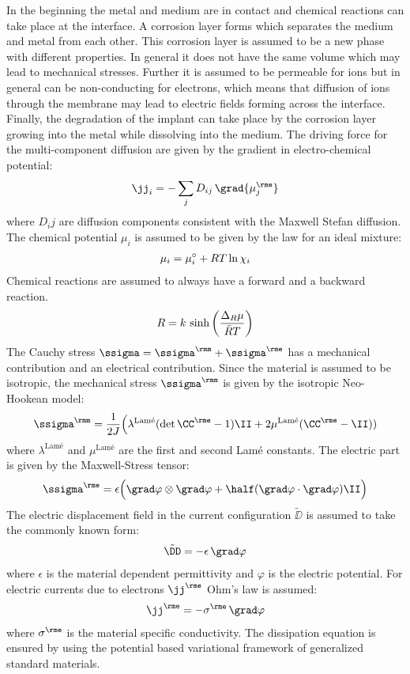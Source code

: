 In the beginning the metal and medium are in contact and chemical reactions can take place at the interface. A corrosion layer forms which separates the medium and metal from each other. This corrosion layer is assumed to be a new phase with different properties. In general it does not have the same volume which may lead to mechanical stresses. Further it is assumed to be permeable for ions but in general can be non-conducting for electrons, which means that diffusion of ions through the membrane may lead to electric fields forming across the interface. Finally, the degradation of the implant can take place by the corrosion layer growing into the metal while dissolving into the medium. The driving force for the multi-component diffusion are given by the gradient in electro-chemical potential:
\begin{align}
  \jj_i = -\sum_j D_{ij} \, \grad{\mu_j^\rme}
\end{align}
where $D_ij$ are diffusion components consistent with the Maxwell Stefan diffusion. The chemical potential $\mu_i$ is assumed to be given by the law for an ideal mixture: 
\begin{align}
  \mu_i = \mu_{i}^{\circ} + RT \ln{\chi_i}
\end{align}
Chemical reactions are assumed to always have a forward and a backward reaction. 
\begin{align}
  R = k\,\sinh\bigg(\frac{\Delta_R \mu}{\bar{R}T}\bigg)
\end{align}
The Cauchy stress $\ssigma=\ssigma^\rmm+\ssigma^\rme$ has a mechanical contribution and an electrical contribution. Since the material is assumed to be isotropic, the mechanical stress $\ssigma^\rmm$ is given by the isotropic Neo-Hookean model: 
\begin{align}
  \ssigma^\rmm = \frac{1}{2J} \Big( \lambda^{\text{Lam\'e}}(\det\CCe-1)\II+2\mu^{\text{Lam\'e}}(\CCe-\II))
\end{align}
where $\lambda^{\text{Lam\'e}}$ and $\mu^{\text{Lam\'e}}$ are the first and second Lam\'e constants.
The electric part is given by the Maxwell-Stress tensor:
\begin{align}
  \ssigma^\rme = \epsilon \Big(\grad\varphi \otimes \grad\varphi + \half (\grad\varphi \cdot \grad\varphi) \II \Big)
\end{align}
The electric displacement field in the current configuration $\tilde \DD$ is assumed to take the commonly known form: 
\begin{align}
  \tilde\DD = -\epsilon \, \grad \varphi
\end{align}
where $\epsilon$ is the material dependent permittivity and $\varphi$ is the electric potential. For electric currents due to electrons $\jj^\rme$ Ohm's law is assumed:
\begin{align}
  \jj^\rme = -\sigma^\rme \, \grad \varphi
\end{align}
where $\sigma^\rme$ is the material specific conductivity.
The dissipation equation is ensured by using the potential based variational framework of generalized standard materials.  
